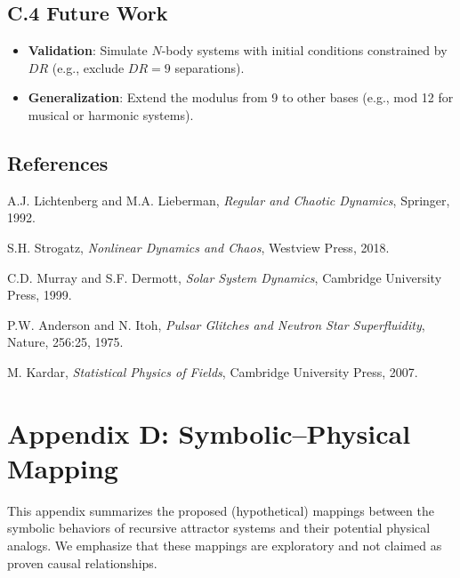 \documentclass[12pt]{article}
\begin{document}
\subsection{C.4 Future Work}

\begin{itemize}
    \item \textbf{Validation}: Simulate \( N \)-body systems with initial conditions constrained by \( DR \) (e.g., exclude \( DR = 9 \) separations).
    \item \textbf{Generalization}: Extend the modulus from 9 to other bases (e.g., mod 12 for musical or harmonic systems).
\end{itemize}

\subsection*{References}

\begin{thebibliography}{9}

A.J. Lichtenberg and M.A. Lieberman,  
\textit{Regular and Chaotic Dynamics}, Springer, 1992.

S.H. Strogatz,  
\textit{Nonlinear Dynamics and Chaos}, Westview Press, 2018.

C.D. Murray and S.F. Dermott,  
\textit{Solar System Dynamics}, Cambridge University Press, 1999.

P.W. Anderson and N. Itoh,  
\textit{Pulsar Glitches and Neutron Star Superfluidity}, Nature, 256:25, 1975.

M. Kardar,  
\textit{Statistical Physics of Fields}, Cambridge University Press, 2007.

\end{thebibliography}
\nextpage

\section{Appendix D: Symbolic--Physical Mapping}

This appendix summarizes the proposed (hypothetical) mappings between the symbolic behaviors of recursive attractor systems and their potential physical analogs.  
We emphasize that these mappings are exploratory and not claimed as proven causal relationships.
\end{document}
